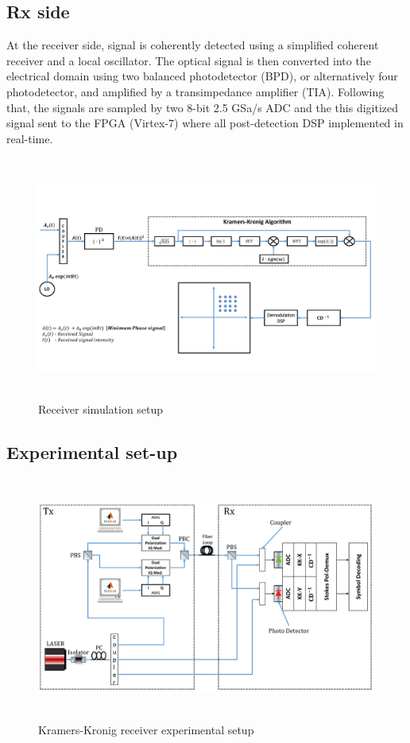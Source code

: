 \subsection{Rx side}
At the receiver side, signal is coherently detected using a simplified coherent receiver and a local oscillator. The optical signal is then converted into the electrical domain using two balanced photodetector (BPD), or alternatively four photodetector, and amplified by a transimpedance amplifier (TIA). Following that, the signals are sampled by two 8-bit 2.5 GSa/s ADC and the this digitized signal sent to the FPGA (Virtex-7) where all post-detection DSP implemented in real-time.
\begin{figure}[h]
	\centering
	\includegraphics[width=1.0\textwidth, height=8cm]{./sdf/simplified_coherent_receiver/figures/Simulation_setup_Rx.pdf}
	\caption{Receiver simulation setup}\label{Simulation_setup_Rx}
\end{figure}

\subsection{Experimental set-up}
\begin{figure}[h]
	\centering
	\includegraphics[width=1.0\textwidth, height=8cm]{./sdf/simplified_coherent_receiver/figures/Practical_setup_TxRx.pdf}
	\caption{Kramers-Kronig receiver experimental setup}\label{Practical_setup_TxRx}
\end{figure}



